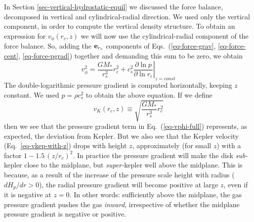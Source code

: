 \documentclass{book}
\begin{document}
In Section \ref{sec-vertical-hydrostatic-equil} we discussed the force balance,
decomposed in vertical and cylindrical-radial direction. We used only the
vertical component, in order to compute the vertical density structure.  To
obtain an expression for $v_\phi(r_c,z)$ we will now use the cylindrical-radial
component of the force balance. So, adding the ${\bf e}_{r_c}$ components of
Eqs.~(\ref{eq-force-grav}, \ref{eq-force-cent}, \ref{eq-force-pgrad}) together
and demanding this sum to be zero, we obtain
\begin{equation}\label{eq-vphi-full}
  v_\phi^2 = \frac{GM_{*}}{r_s^3}r_c^2 + c_s^2\left.\frac{\partial \ln p}{\partial \ln r_c}\right|_{z=const}
\end{equation}
The double-logarithmic pressure gradient is computed horizontally, keeping $z$
constant. We used $p=\rho c_s^2$ to obtain the above equation. If we
define
\begin{equation}\label{eq-vkep-with-z}
v_K(r_c,z) \equiv \sqrt{\frac{GM_{*}}{r_s^3}r_c^2}
\end{equation}
then we see that the pressure gradient term in Eq.~(\ref{eq-vphi-full})
represents, as expected, the deviation from Kepler. But we also see that the
Kepler velocity (Eq.~\ref{eq-vkep-with-z}) drops with height $z$, approximately
(for small $z$) with a factor $1-1.5\,(z/r_c)^2$. In practice the pressure
gradient will make the disk {\em sub-}kepler close to the midplane, but {\em
  super-}kepler well above the midplane. This is because, as a result of the
increase of the pressure scale height with radius ($dH_p/dr>0$), the radial
pressure gradient will become positive at large $z$, even if it is negative at
$z=0$. In other words: sufficiently above the midplane, the gas pressure
gradient pushes the gas {\em inward}, irrespective of whether the midplane
pressure gradient is negative or positive.
\end{document}
